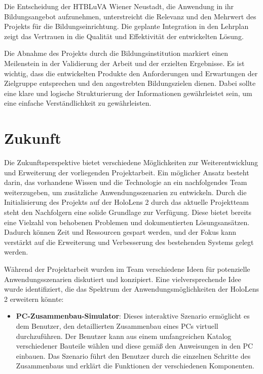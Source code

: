 Die Entscheidung der HTBLuVA Wiener Neustadt, die Anwendung in ihr Bildungsangebot aufzunehmen, unterstreicht die Relevanz
und den Mehrwert des Projekts für die Bildungseinrichtung. Die geplante Integration in den Lehrplan zeigt das Vertrauen
in die Qualität und Effektivität der entwickelten Lösung.

Die Abnahme des Projekts durch die Bildungsinstitution markiert einen Meilenstein in der Validierung der Arbeit und der
erzielten Ergebnisse. Es ist wichtig, dass die entwickelten Produkte den Anforderungen und Erwartungen der Zielgruppe
entsprechen und den angestrebten Bildungszielen dienen. Dabei sollte eine klare und logische Strukturierung der Informationen
gewährleistet sein, um eine einfache Verständlichkeit zu gewährleisten.

\section{Zukunft}
Die Zukunftsperspektive bietet verschiedene Möglichkeiten zur Weiterentwicklung und Erweiterung der vorliegenden Projektarbeit.
Ein möglicher Ansatz besteht darin, das vorhandene Wissen und die Technologie an ein nachfolgendes Team weiterzugeben,
um zusätzliche Anwendungsszenarien zu entwickeln. Durch die Initialisierung des Projekts auf der HoloLens 2 durch das aktuelle
Projektteam steht den Nachfolgern eine solide Grundlage zur Verfügung. Diese bietet bereits eine Vielzahl von behobenen
Problemen und dokumentierten Lösungsansätzen. Dadurch können Zeit und Ressourcen gespart werden, und der Fokus kann
verstärkt auf die Erweiterung und Verbesserung des bestehenden Systems gelegt werden.

Während der Projektarbeit wurden im Team verschiedene Ideen für potenzielle Anwendungsszenarien diskutiert und konzipiert.
Eine vielversprechende Idee wurde identifiziert, die das Spektrum der Anwendungsmöglichkeiten der HoloLens 2 erweitern könnte:

\begin{itemize}
    \item \textbf{PC-Zusammenbau-Simulator}: Dieses interaktive Szenario ermöglicht es dem Benutzer, den detaillierten
    Zusammenbau eines PCs virtuell durchzuführen. Der Benutzer kann aus einem umfangreichen Katalog verschiedener Bauteile
    wählen und diese gemäß den Anweisungen in den PC einbauen. Das Szenario führt den Benutzer durch die einzelnen Schritte
    des Zusammenbaus und erklärt die Funktionen der verschiedenen Komponenten.
\end{itemize}